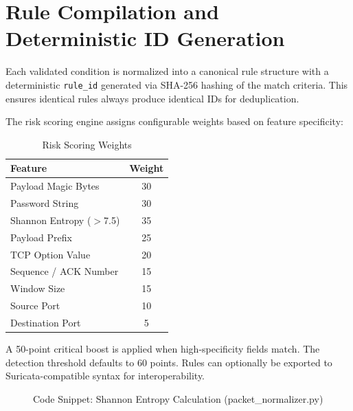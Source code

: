 \section{Rule Compilation and Deterministic ID Generation}

Each validated condition is normalized into a canonical rule structure with a deterministic \texttt{rule\_id} generated via SHA-256 hashing of the match criteria. This ensures identical rules always produce identical IDs for deduplication.

The risk scoring engine assigns configurable weights based on feature specificity:

\begin{table}[h]
\centering
\caption{Risk Scoring Weights}
\label{tab:weights}
\begin{tabular}{|l|c|}
\hline
\textbf{Feature} & \textbf{Weight} \\
\hline
Payload Magic Bytes & 30 \\
\hline
Password String & 30 \\
\hline
Shannon Entropy ($>$7.5) & 35 \\
\hline
Payload Prefix & 25 \\
\hline
TCP Option Value & 20 \\
\hline
Sequence / ACK Number & 15 \\
\hline
Window Size & 15 \\
\hline
Source Port & 10 \\
\hline
Destination Port & 5 \\
\hline
\end{tabular}
\end{table}

A 50-point critical boost is applied when high-specificity fields match. The detection threshold defaults to 60 points. Rules can optionally be exported to Suricata-compatible syntax for interoperability.

\begin{figure}[h]
\centering
{}
\caption{Code Snippet: Shannon Entropy Calculation (packet\_normalizer.py)}
\label{fig:code_entropy}
\end{figure}

